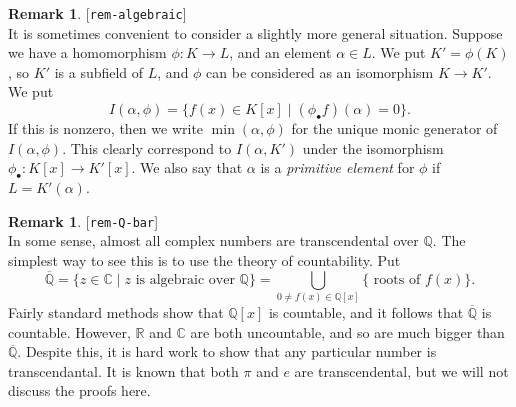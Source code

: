 \documentclass{amsart}
\newcommand{\lbl}[1]{\label{#1}\textup{[\texttt{#1}]}\ \\}
\newcommand{\lbl}{\label}
\newcommand{\Q}         {{\mathbb{Q}}}
\newcommand{\R}         {{\mathbb{R}}}
\newcommand{\C}         {{\mathbb{C}}}
\newcommand{\al}        {\alpha}
\newcommand{\ov}[1]     {\overline{#1}}
\newcommand{\st}        {\;|\;}
\renewcommand{\:}{\colon}
\theoremstyle{definition}
\newtheorem{remark}[theorem]{Remark}
\begin{document}
\begin{remark}\lbl{rem-algebraic}
 It is sometimes convenient to consider a slightly more general
 situation.  Suppose we have a homomorphism $\phi\:K\to L$, and an
 element $\al\in L$.  We put $K'=\phi(K)$, so $K'$ is a subfield of
 $L$, and $\phi$ can be considered as an isomorphism $K\to K'$.  We
 put 
 \[ I(\al,\phi)=\{f(x)\in K[x]\st(\phi_\bullet f)(\al)=0\}. \]
 If this is nonzero, then we write $\min(\al,\phi)$ for the unique
 monic generator of $I(\al,\phi)$.  This clearly correspond to
 $I(\al,K')$ under the isomorphism $\phi_\bullet\:K[x]\to K'[x]$.  We
 also say that $\al$ is a \emph{primitive element} for $\phi$ if
 $L=K'(\al)$.  
\end{remark}

\begin{remark}\lbl{rem-Q-bar}
 In some sense, almost all complex numbers are transcendental over
 $\Q$.  The simplest way to see this is to use the theory of
 countability.  Put 
 \[ \ov{\Q} = \{z\in\C\st z \text{ is algebraic over } \Q\}
      = \bigcup_{0\neq f(x)\in\Q[x]}\{ \text{ roots of } f(x) \}.
 \]
 Fairly standard methods show that $\Q[x]$ is countable, and it
 follows that $\ov{\Q}$ is countable.  However, $\R$ and $\C$ are both
 uncountable, and so are much bigger than $\ov{\Q}$.  Despite this, it
 is hard work to show that any particular number is transcendantal.
 It is known that both $\pi$ and $e$ are transcendental, but we will
 not discuss the proofs here.
\end{remark}
\end{document}
